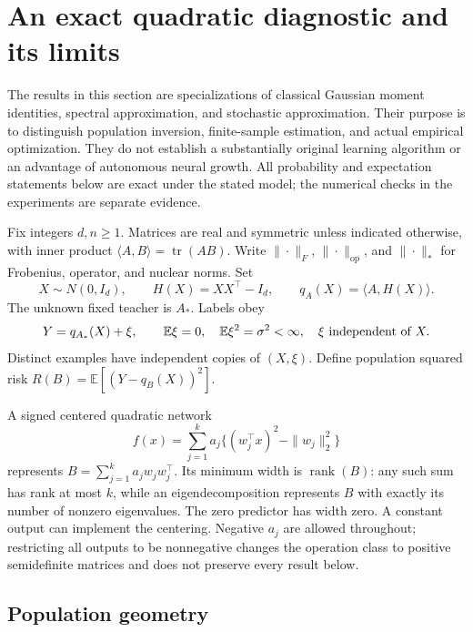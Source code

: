 \section{An exact quadratic diagnostic and its limits}
\label{sec:quadratic-theory}

The results in this section are specializations of classical Gaussian
moment identities, spectral approximation, and stochastic approximation.
Their purpose is to distinguish population inversion, finite-sample
estimation, and actual empirical optimization. They do not establish a
substantially original learning algorithm or an advantage of autonomous
neural growth. All probability and expectation statements below are exact
under the stated model; the numerical checks in the experiments are
separate evidence.

Fix integers $d,n\geq1$. Matrices are real and symmetric unless indicated
otherwise, with inner product $\langle A,B\rangle=\operatorname{tr}(AB)$.
Write $\|\cdot\|_F$, $\|\cdot\|_{\mathrm{op}}$, and $\|\cdot\|_*$ for
Frobenius, operator, and nuclear norms. Set
\[
 X\sim N(0,I_d),\qquad H(X)=XX^\top-I_d,\qquad
 q_A(X)=\langle A,H(X)\rangle.
\]
The unknown fixed teacher is $A_*$. Labels obey
\begin{equation}
 Y=q_{A_*}(X)+\xi,\qquad
 \mathbb E\xi=0,\quad \mathbb E\xi^2=\sigma^2<\infty,
 \quad \xi\ \hbox{independent of }X.
 \label{eq:quadratic-model}
\end{equation}
Distinct examples have independent copies of $(X,\xi)$. Define population
squared risk $R(B)=\mathbb E[(Y-q_B(X))^2]$.

A signed centered quadratic network
\[
 f(x)=\sum_{j=1}^k a_j\{(w_j^\top x)^2-\|w_j\|_2^2\}
\]
represents $B=\sum_{j=1}^k a_jw_jw_j^\top$. Its minimum width is
$\operatorname{rank}(B)$: any such sum has rank at most $k$, while an
eigendecomposition represents $B$ with exactly its number of nonzero
eigenvalues. The zero predictor has width zero. A constant output can
implement the centering. Negative $a_j$ are allowed throughout; restricting
all outputs to be nonnegative changes the operation class to positive
semidefinite matrices and does not preserve every result below.

\subsection{Population geometry}

